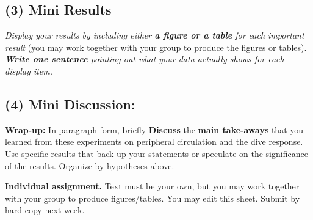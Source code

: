 \documentclass[
  letterpaper,
  DIV=11,
  numbers=noendperiod]{scrartcl}
\begin{document}
\hypertarget{mini-results}{%
\subsection{(3) Mini Results}\label{mini-results}}

\emph{Display your results by including either \textbf{a figure or a
table} for each important result} (you may work together with your group
to produce the figures or tables). \emph{\textbf{Write one sentence}
pointing out what your data actually shows for each display item.}

\hypertarget{mini-discussion}{%
\subsection{(4) Mini Discussion:}\label{mini-discussion}}

\textbf{Wrap-up:} In paragraph form, briefly \textbf{Discuss} the
\textbf{main take-aways} that you learned from these experiments on
peripheral circulation and the dive response. Use specific results that
back up your statements or speculate on the significance of the results.
Organize by hypotheses above.

\textbf{Individual assignment.} Text must be your own, but you may work
together with your group to produce figures/tables. You may edit this
sheet. Submit by hard copy next week.
\end{document}
